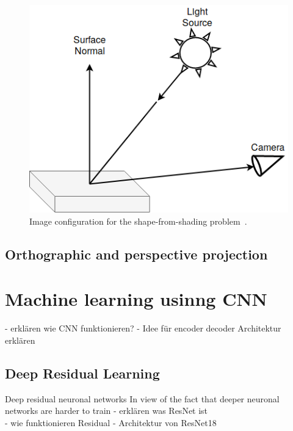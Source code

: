 	\begin{figure}
	 	\centering
	 	\includegraphics[height=0.2\textheight]{images/surface_normal.png}
	 	\caption{Image configuration for the shape-from-shading problem~\cite{Reflectance_map_techniques}.}
	 	\label{fig:surface_normal}
	\end{figure}
	\subsection{Orthographic and perspective projection}
	\label{sec:background:projection}
	

\section{Machine learning usinng CNN}
\label{sec:background:CNN}
- erklären wie CNN funktionieren? 
- Idee für encoder decoder Architektur erklären

\subsection{Deep Residual Learning}
\label{sec:background:mlCNN:resnet}
	Deep residual neuronal networks 
	In view of the fact that deeper neuronal networks are harder to train
- erklären was ResNet ist \\
- wie funktionieren Residual
- Architektur von ResNet18
